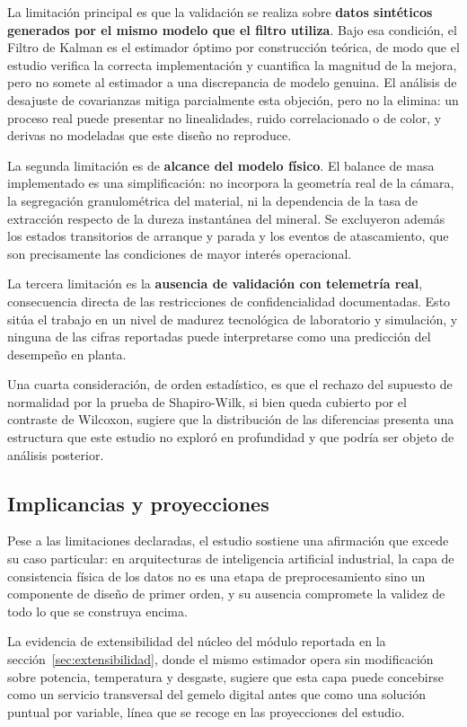 La limitación principal es que la validación se realiza sobre \textbf{datos
sintéticos generados por el mismo modelo que el filtro utiliza}. Bajo esa
condición, el Filtro de Kalman es el estimador óptimo por construcción teórica,
de modo que el estudio verifica la correcta implementación y cuantifica la
magnitud de la mejora, pero no somete al estimador a una discrepancia de modelo
genuina. El análisis de desajuste de covarianzas mitiga parcialmente esta
objeción, pero no la elimina: un proceso real puede presentar no linealidades,
ruido correlacionado o de color, y derivas no modeladas que este diseño no
reproduce.

La segunda limitación es de \textbf{alcance del modelo físico}. El balance de
masa implementado es una simplificación: no incorpora la geometría real de la
cámara, la segregación granulométrica del material, ni la dependencia de la tasa
de extracción respecto de la dureza instantánea del mineral. Se excluyeron
además los estados transitorios de arranque y parada y los eventos de
atascamiento, que son precisamente las condiciones de mayor interés operacional.

La tercera limitación es la \textbf{ausencia de validación con telemetría
real}, consecuencia directa de las restricciones de confidencialidad
documentadas. Esto sitúa el trabajo en un nivel de madurez tecnológica de
laboratorio y simulación, y ninguna de las cifras reportadas puede interpretarse
como una predicción del desempeño en planta.

Una cuarta consideración, de orden estadístico, es que el rechazo del supuesto
de normalidad por la prueba de Shapiro-Wilk, si bien queda cubierto por el
contraste de Wilcoxon, sugiere que la distribución de las diferencias presenta
una estructura que este estudio no exploró en profundidad y que podría ser
objeto de análisis posterior.

\subsection{Implicancias y proyecciones}

Pese a las limitaciones declaradas, el estudio sostiene una afirmación que
excede su caso particular: en arquitecturas de inteligencia artificial
industrial, la capa de consistencia física de los datos no es una etapa de
preprocesamiento sino un componente de diseño de primer orden, y su ausencia
compromete la validez de todo lo que se construya encima.

La evidencia de extensibilidad del núcleo del módulo reportada en la
sección~\ref{sec:extensibilidad}, donde el mismo estimador opera sin
modificación sobre potencia, temperatura y desgaste, sugiere que esta capa puede
concebirse como un servicio transversal del gemelo digital antes que como una
solución puntual por variable, línea que se recoge en las proyecciones del
estudio.
